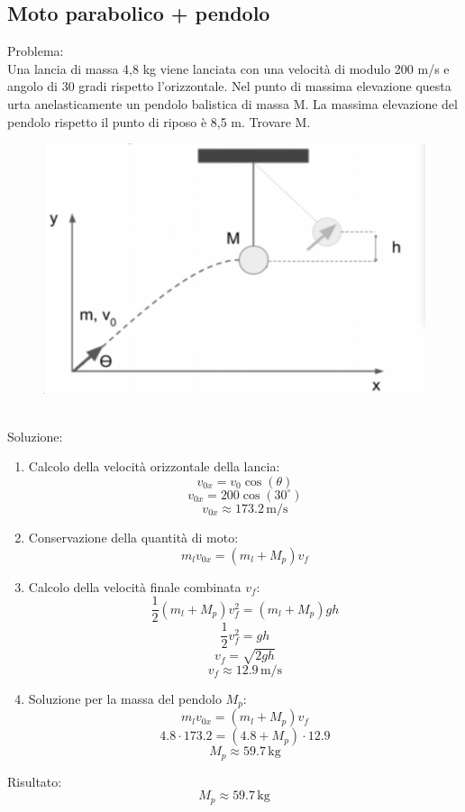 \documentclass{article}
\begin{document}
\subsection{Moto parabolico + pendolo}
Problema:\\
Una lancia di massa 4,8 kg viene lanciata con una velocità di modulo 200 m/s e angolo di 30 gradi rispetto l'orizzontale. Nel punto di massima elevazione questa urta anelasticamente un pendolo balistica di massa M. La massima elevazione del pendolo rispetto il punto di riposo è 8,5 m. Trovare M.\\
\begin{figure}[ht]
    \centering
    \includegraphics[width=0.5\linewidth]{Immagini/parabolicoependolo.png}
\end{figure}
\\
Soluzione:
\begin{enumerate}
    \item Calcolo della velocità orizzontale della lancia:
    \[ v_{0x} = v_0 \cos(\theta) \]
    \[ v_{0x} = 200 \cos(30^\circ) \]
    \[ v_{0x} \approx 173.2 \, \text{m/s} \]
    
    \item Conservazione della quantità di moto:
    \[ m_l v_{0x} = (m_l + M_p) v_f \]
    
    \item Calcolo della velocità finale combinata \( v_f \):
    \[ \frac{1}{2} (m_l + M_p) v_f^2 = (m_l + M_p) g h \]
    \[ \frac{1}{2} v_f^2 = g h \]
    \[ v_f = \sqrt{2 g h} \]
    \[ v_f \approx 12.9 \, \text{m/s} \]
     
    \item Soluzione per la massa del pendolo \( M_p \):
    \[ m_l v_{0x} = (m_l + M_p) v_f \]
    \[ 4.8 \cdot 173.2 = (4.8 + M_p) \cdot 12.9 \]
    \[ M_p \approx 59.7 \, \text{kg} \]
\end{enumerate}

\noindent Risultato:
\[ M_p \approx 59.7 \, \text{kg} \]
\end{document}
